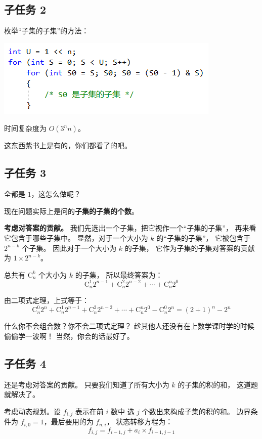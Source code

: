 \documentclass[UTF8]{article}
\begin{document}
	\subsection{子任务 2}

	枚举``子集的子集''的方法：

	\includegraphics[scale=0.65]{pic/pic2.png}

	时间复杂度为 $O(3^n n)$。

	这东西紫书上是有的，你们都看了的吧。

	\subsection{子任务 3}

	全都是 $1$，这怎么做呢？

	现在问题实际上是问的\textbf{子集的子集的个数}。

	\textbf{考虑对答案的贡献。}
	我们先选出一个子集，把它视作一个``子集的子集''，
	再来看它包含于哪些子集中。
	显然，对于一个大小为 $k$ 的``子集的子集''，
	它被包含于 $2^{n - k}$ 个子集。
	因此对于一个大小为 $k$ 的子集，
	它作为子集的子集对答案的贡献为 $1 \times 2^{n - k}$。

	总共有 $\mathrm{C}_{n}^{k}$ 个大小为 $k$ 的子集，
	所以最终答案为：
	$$
	\mathrm{C}_{n}^{1} 2^{n - 1} +
	\mathrm{C}_{n}^{2} 2^{n - 2} + \cdots +
	\mathrm{C}_{n}^{n} 2^{0}
	$$

	由二项式定理，上式等于：
	$$
	\mathrm{C}_{n}^{0} 2^{n} +
	\mathrm{C}_{n}^{1} 2^{n - 1} +
	\mathrm{C}_{n}^{2} 2^{n - 2} + \cdots +
	\mathrm{C}_{n}^{n} 2^{0} -
	\mathrm{C}_{n}^{0} 2^{n}
	= (2 + 1)^n - 2^n
	$$

	什么你不会组合数？你不会二项式定理？
	趁其他人还没有在上数学课时学的时候偷偷学一波啊！
	当然，你会的话最好了。

	\subsection{子任务 4}

	还是考虑对答案的贡献。
	只要我们知道了所有大小为 $k$ 的子集的积的和，
	这道题就解决了。

	考虑动态规划。设 $f_{i, j}$ 表示在前 $i$ 数中
	选 $j$ 个数出来构成子集的积的和。
	边界条件为 $f_{i, 0} = 1$，最后要用的为 $f_{n, i}$，
	状态转移方程为：
	$$
	f_{i, j} = f_{i - 1, j} + a_i \times f_{i - 1, j - 1}
	$$
\end{document}
